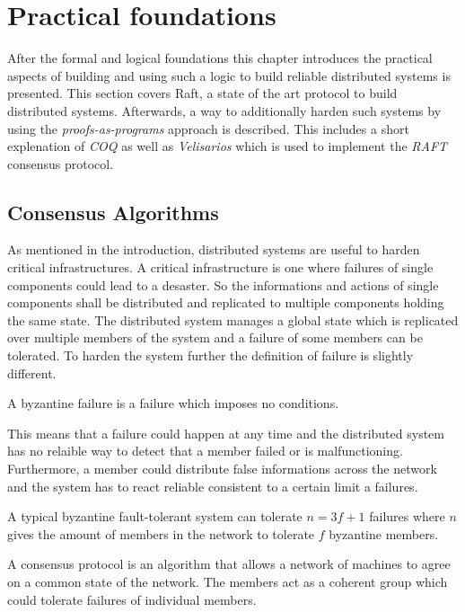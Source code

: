 %
\section{Practical foundations}
\label{sec_3}

After the formal and logical foundations this chapter introduces
the practical aspects of building and using such a logic to build
reliable distributed systems is presented. This section covers Raft,
a state of the art protocol to build distributed systems.
Afterwards, a way to additionally harden such systems by using
the \textit{proofs-as-programs} approach is described.
This includes a short explenation of \textit{COQ} as well as
\textit{Velisarios} which is used to implement the \textit{RAFT}
consensus protocol.

\subsection{Consensus Algorithms}
As mentioned in the introduction, distributed systems are useful to harden
critical infrastructures. A critical infrastructure is one where failures
of single components could lead to a desaster. So the informations and
actions of single components shall be distributed and replicated to multiple
components holding the same state. The distributed system manages a
global state which is replicated over multiple members of the system and
a failure of some members can be tolerated. To harden the system further
the definition of failure is slightly different.~\cite{rahli2018velisarios}

\begin{defi}
  A byzantine failure is a failure which imposes no conditions.
\end{defi}

This means that a failure could happen at any time and the distributed
system has no relaible way to detect that a member failed or is malfunctioning.
Furthermore, a member could distribute false informations across the network
and the system has to react reliable consistent to a certain limit a failures.~\cite{lamport1982byzantine}

\begin{defi}
  A typical byzantine fault-tolerant system can tolerate $n=3f+1$ failures
  where $n$ gives the amount of members in the network to tolerate $f$ byzantine
  members.
\end{defi}

\begin{defi}
  A consensus protocol is an algorithm that allows a network of machines to
  agree on a common state of the network. The members act as a coherent
  group which could tolerate failures of individual members.
\end{defi}

